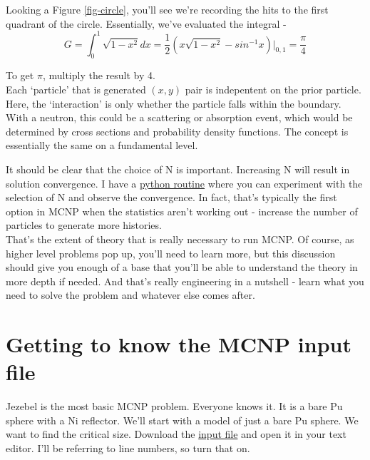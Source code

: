 \documentclass[11pt,a4paper]{article}
\begin{document}
\noindent Looking a Figure \ref{fig-circle}, you'll see we're recording the hits to the first quadrant of the circle. Essentially, we've evaluated the integral - 
\begin{equation}
    G = \int_0^1 \sqrt{1-x^2} dx = \frac{1}{2}(x\sqrt{1-x^2} - sin^{-1}x)|_{0,1} = \frac{\pi}{4}
\end{equation}

\noindent To get $\pi$, multiply the result by 4.\\

\noindent Each `particle' that is generated $(x,y)$ pair is indepentent on the prior particle. Here, the `interaction' is only whether the particle falls within the boundary. With a neutron, this could be a scattering or absorption event, which would be determined by cross sections and probability density functions. The concept is essentially the same on a fundamental level. 

\noindent It should be clear that the choice of N is important. Increasing N will result in solution convergence. I have a \href{https://github.com/TheDoctorRAB/education/blob/master/src/monte.carlo.simple.py}{python routine} where you can experiment with the selection of N and observe the convergence. In fact, that's typically the first option in MCNP when the statistics aren't working out - increase the number of particles to generate more histories. \\

\noindent That's the extent of theory that is really necessary to run MCNP. Of course, as higher level problems pop up, you'll need to learn more, but this discussion should give you enough of a base that you'll be able to understand the theory in more depth if needed. And that's really engineering in a nutshell - learn what you need to solve the problem and whatever else comes after. 

\newpage


\section{Getting to know the MCNP input file}
\noindent Jezebel is the most basic MCNP problem. Everyone knows it. It is a bare Pu sphere with a Ni reflector. We'll start with a model of just a bare Pu sphere. We want to find the critical size. Download the \href{https://github.com/TheDoctorRAB/mcnpx.decks/blob/master/criticality/jezebel-light.inp}{input file} and open it in your text editor. I'll be referring to line numbers, so turn that on. \\
\end{document}
